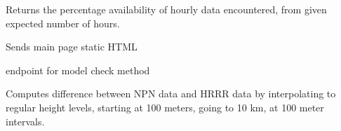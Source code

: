 \documentclass[letterpaper,10pt,english]{sphinxmanual}
\begin{document}

\begin{fulllineitems}
\label{\detokenize{index:compare_npn_to_model.hourly}}
Returns the percentage availability of hourly data encountered,
from given expected number of hours.

\end{fulllineitems}


\begin{fulllineitems}
\label{\detokenize{index:compare_npn_to_model.index_html}}
Sends main page static HTML

\end{fulllineitems}


\begin{fulllineitems}
\label{\detokenize{index:compare_npn_to_model.model}}
endpoint for model check method

\end{fulllineitems}


\begin{fulllineitems}
\label{\detokenize{index:compare_npn_to_model.model_check}}
Computes difference between NPN data and HRRR data by interpolating to 
regular height levels, starting at 100 meters, going to 10 km, at 100 meter intervals.

\end{fulllineitems}
\end{document}
